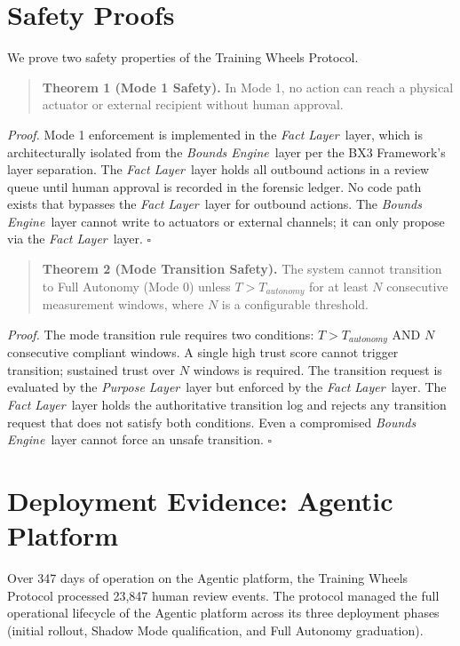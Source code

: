 \documentclass[12pt]{article}
\newcommand{\purpose}{\textit{Purpose Layer}}
\newcommand{\bounds}{\textit{Bounds Engine}}
\newcommand{\fact}{\textit{Fact Layer}}
\begin{document}
\section{Safety Proofs}
\label{sec:safetyproofs}

We prove two safety properties of the Training Wheels Protocol.

\begin{quote}
\textbf{Theorem 1 (Mode 1 Safety).} In Mode 1, no action can reach a physical actuator or external recipient without human approval.
\end{quote}
\textit{Proof.} Mode 1 enforcement is implemented in the \fact\ layer, which is architecturally isolated from the \bounds\ layer per the BX3 Framework's layer separation. The \fact\ layer holds all outbound actions in a review queue until human approval is recorded in the forensic ledger. No code path exists that bypasses the \fact\ layer for outbound actions. The \bounds\ layer cannot write to actuators or external channels; it can only propose via the \fact\ layer. $\square$

\begin{quote}
\textbf{Theorem 2 (Mode Transition Safety).} The system cannot transition to Full Autonomy (Mode 0) unless $T > T_{autonomy}$ for at least $N$ consecutive measurement windows, where $N$ is a configurable threshold.
\end{quote}
\textit{Proof.} The mode transition rule requires two conditions: $T > T_{autonomy}$ AND $N$ consecutive compliant windows. A single high trust score cannot trigger transition; sustained trust over $N$ windows is required. The transition request is evaluated by the \purpose\ layer but enforced by the \fact\ layer. The \fact\ layer holds the authoritative transition log and rejects any transition request that does not satisfy both conditions. Even a compromised \bounds\ layer cannot force an unsafe transition. $\square$

\section{Deployment Evidence: Agentic Platform}
\label{sec:deployment}

Over 347 days of operation on the Agentic platform, the Training Wheels Protocol processed 23,847 human review events. The protocol managed the full operational lifecycle of the Agentic platform across its three deployment phases (initial rollout, Shadow Mode qualification, and Full Autonomy graduation).
\end{document}
